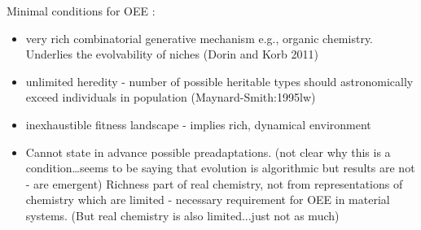 Minimal conditions for OEE \autocite{Vasas2015}:
\begin{itemize}
\item

very rich combinatorial generative mechanism e.g., organic
chemistry. Underlies the evolvability of niches (Dorin and Korb
2011)

\item

unlimited heredity - number of possible heritable types should
astronomically exceed individuals in population
(Maynard-Smith:1995lw)

\item

inexhaustible fitness landscape - implies rich, dynamical
environment

\item

Cannot state in advance possible preadaptations. (not clear why this
is a condition\ldots{}seems to be saying that evolution is
algorithmic but results are not - are emergent) Richness part of
real chemistry, not from representations of chemistry which are
limited - necessary requirement for OEE in material systems. (But
real chemistry is also limited...just not as much)

\end{itemize}
			
{\autocite{Ruiz-Mirazo2004}}


